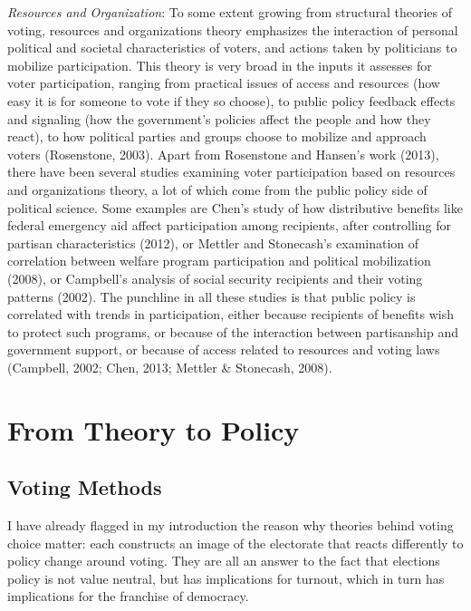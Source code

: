 \documentclass[12pt,twoside]{reedthesis}
\begin{document}
\begin{itemize}
    \emph{Resources and Organization}: To some extent growing from
    structural theories of voting, resources and organizations theory
    emphasizes the interaction of personal political and societal
    characteristics of voters, and actions taken by politicians to
    mobilize participation. This theory is very broad in the inputs it
    assesses for voter participation, ranging from practical issues of
    access and resources (how easy it is for someone to vote if they so
    choose), to public policy feedback effects and signaling (how the
    government's policies affect the people and how they react), to how
    political parties and groups choose to mobilize and approach voters
    (Rosenstone, 2003). Apart from Rosenstone and Hansen's work (2013),
    there have been several studies examining voter participation based on
    resources and organizations theory, a lot of which come from the
    public policy side of political science. Some examples are Chen's
    study of how distributive benefits like federal emergency aid affect
    participation among recipients, after controlling for partisan
    characteristics (2012), or Mettler and Stonecash's examination of
    correlation between welfare program participation and political
    mobilization (2008), or Campbell's analysis of social security
    recipients and their voting patterns (2002). The punchline in all
    these studies is that public policy is correlated with trends in
    participation, either because recipients of benefits wish to protect
    such programs, or because of the interaction between partisanship and
    government support, or because of access related to resources and
    voting laws (Campbell, 2002; Chen, 2013; Mettler \& Stonecash, 2008).
  \end{itemize}
  
  \section{From Theory to Policy}\label{from-theory-to-policy}
  
  \subsection{Voting Methods}\label{voting-methods}
  
  I have already flagged in my introduction the reason why theories behind
  voting choice matter: each constructs an image of the electorate that
  reacts differently to policy change around voting. They are all an
  answer to the fact that elections policy is not value neutral, but has
  implications for turnout, which in turn has implications for the
  franchise of democracy.
  
\end{document}
